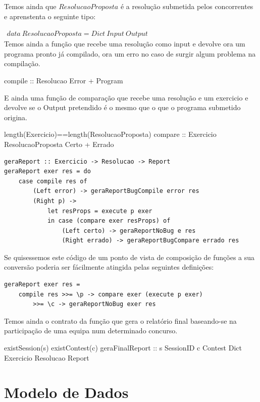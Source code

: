 Temos ainda que $ResolucaoProposta$ é a resolução submetida pelos concorrentes e aprenstenta o seguinte tipo:

$\begin{array}{l}
data~ResolucaoProposta = Dict~Input~Output
\end{array}$\\

Temos ainda a função que recebe uma resolução como input e devolve ora um programa pronto já compilado, ora um erro no caso de surgir algum problema na compilação.

\prop
{ }
{compile :: Resolucao \rarrow Error + Program}
{ }

E ainda uma função de comparação que recebe uma resolução e um exercicio e devolve se o Output pretendido é o mesmo que o que o programa submetido origina.

\prop
{ length(Exercicio)==length(ResolucaoProposta)}
{compare :: Exercicio \rarrow ResolucaoProposta \rarrow Certo + Errado}
{ }

\begin{lstlisting}[language=HaskellUlisses]
geraReport :: Exercicio -> Resolucao -> Report
geraReport exer res = do
	case compile res of
		(Left error) -> geraReportBugCompile error res
		(Right p) ->
			let resProps = execute p exer
			in case (compare exer resProps) of
				(Left certo) -> geraReportNoBug e res
				(Right errado) -> geraReportBugCompare errado res
\end{lstlisting}

Se quisessemos este código de um ponto de vista de composição de funções a sua conversão poderia ser fácilmente atingida pelas seguintes definições:

\begin{lstlisting}[language=HaskellUlisses]
geraReport exer res =
	compile res >>= \p -> compare exer (execute p exer)
		>>= \c -> geraReportNoBug exer res
\end{lstlisting}


Temos ainda o contrato da função que gera o relatório final baseando-se na participação de uma equipa num determinado concurso.

\prop
{ existSession(s) \wedge existContest(c) \wedge }
{geraFinalReport :: s \unif SessionID \rarrow c \unif Contest \rarrow Dict Exercicio Resolucao \rarrow Report}
{ }

\section{Modelo de Dados}\label{sec modedados}

